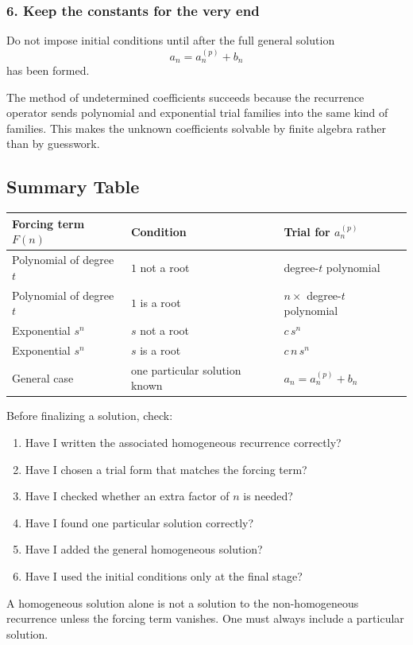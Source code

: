 \subsubsection*{6. Keep the constants for the very end}
Do not impose initial conditions until after the full general solution
\[
a_n=a_n^{(p)}+b_n
\]
has been formed.

\begin{extension}[title={Why the method works so efficiently}]
The method of undetermined coefficients succeeds because the recurrence operator sends polynomial and exponential trial families into the same kind of families. This makes the unknown coefficients solvable by finite algebra rather than by guesswork.
\end{extension}

\subsection{Summary Table}

\begin{center}
\small
\begin{tabular}{@{}p{}p{}p{}@{}}
\toprule
\textbf{Forcing term \(F(n)\)} & \textbf{Condition} & \textbf{Trial for \(a_n^{(p)}\)} \\
\midrule
Polynomial of degree \(t\) & \(1\) not a root & degree-\(t\) polynomial \\
Polynomial of degree \(t\) & \(1\) is a root & \(n\times\) degree-\(t\) polynomial \\
Exponential \(s^n\) & \(s\) not a root & \(c\,s^n\) \\
Exponential \(s^n\) & \(s\) is a root & \(c\,n\,s^n\) \\
General case & one particular solution known & \(a_n=a_n^{(p)}+b_n\) \\
\bottomrule
\end{tabular}
\end{center}

\begin{examtip}[title={Final checklist for Handout 06}]
Before finalizing a solution, check:
\begin{enumerate}[leftmargin=*]
    \item Have I written the associated homogeneous recurrence correctly?
    \item Have I chosen a trial form that matches the forcing term?
    \item Have I checked whether an extra factor of \(n\) is needed?
    \item Have I found one particular solution correctly?
    \item Have I added the general homogeneous solution?
    \item Have I used the initial conditions only at the final stage?
\end{enumerate}
\end{examtip}

\begin{commonmistake}[title={Solving only the homogeneous part}]
A homogeneous solution alone is not a solution to the non-homogeneous recurrence unless the forcing term vanishes. One must always include a particular solution.
\end{commonmistake}